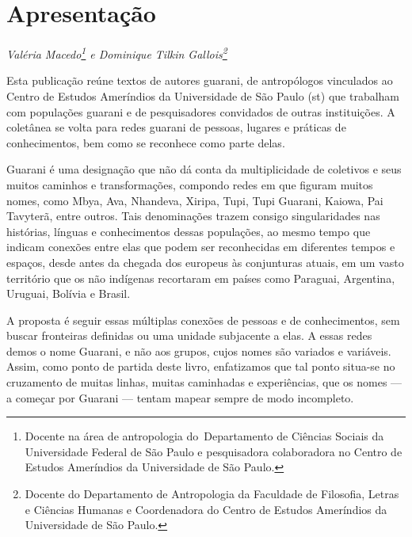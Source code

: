 \chapter{Apresentação}
\begin{flushright}
\emph{Valéria Macedo\footnote{Docente na área de antropologia
do~Departamento de Ciências Sociais da Universidade Federal de São
Paulo e pesquisadora colaboradora no Centro de Estudos Ameríndios da
Universidade de São Paulo.} e Dominique Tilkin Gallois\footnote{Docente do Departamento de Antropologia da Faculdade de Filosofia, Letras e Ciências Humanas e Coordenadora do Centro de Estudos Ameríndios da Universidade de São Paulo.}}
\end{flushright}
\medskip
Esta publicação reúne textos de autores guarani, de antropólogos
vinculados ao Centro de Estudos Ameríndios da Universidade de São Paulo
(st) que trabalham com populações guarani e de pesquisadores
convidados de outras instituições. A coletânea se volta para redes
guarani de pessoas, lugares e práticas de conhecimentos, bem como se
reconhece como parte delas. 

Guarani é uma designação que não dá conta da multiplicidade de coletivos
e seus muitos caminhos e transformações, compondo redes em que figuram
muitos nomes, como Mbya, Ava, Nhandeva, Xiripa, Tupi, Tupi Guarani,
Kaiowa, Pai Tavyterã, entre outros. Tais denominações trazem consigo
singularidades nas histórias, línguas e conhecimentos dessas
populações, ao mesmo tempo que indicam conexões entre elas que podem
ser reconhecidas em diferentes tempos e espaços, desde antes da chegada
dos europeus às conjunturas atuais, em um vasto território que os não
indígenas recortaram em países como Paraguai, Argentina, Uruguai,
Bolívia e Brasil.

A proposta é seguir essas múltiplas conexões de pessoas e de
conhecimentos, sem buscar fronteiras definidas ou uma unidade
subjacente a elas. A essas redes demos o nome Guarani, e não aos
grupos, cujos nomes são variados e variáveis. Assim, como ponto de
partida deste livro, enfatizamos que tal ponto situa-se no cruzamento
de muitas linhas, muitas caminhadas e experiências, que os nomes — a
começar por Guarani — tentam mapear sempre de modo incompleto.

